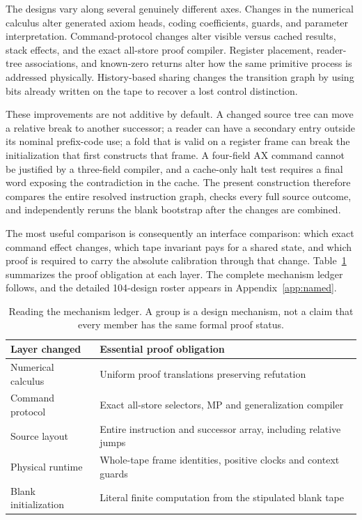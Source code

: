 \documentclass[11pt,a4paper]{article}
\begin{document}
The designs vary along several genuinely different axes. Changes in the
numerical calculus alter generated axiom heads, coding coefficients,
guards, and parameter interpretation. Command-protocol changes alter
visible versus cached results, stack effects, and the exact all-store
proof compiler. Register placement, reader-tree associations, and known-zero
returns alter how the same primitive process is addressed physically.
History-based sharing changes the transition graph by using bits already
written on the tape to recover a lost control distinction.

These improvements are not additive by default. A changed source tree can
move a relative break to another successor; a reader can have a secondary
entry outside its nominal prefix-code use; a fold that is valid on a
register frame can break the initialization that first constructs that
frame. A four-field AX command cannot be justified by a three-field
compiler, and a cache-only halt test requires a final word exposing the
contradiction in the cache. The present construction therefore compares
the entire resolved instruction graph, checks every full source outcome,
and independently reruns the blank bootstrap after the changes are combined.

The most useful comparison is consequently an interface comparison:
which exact command effect changes, which tape invariant pays for a shared
state, and which proof is required to carry the absolute calibration
through that change. Table~\ref{tab:families-note} summarizes the proof
obligation at each layer. The complete mechanism ledger follows, and the
detailed 104-design roster appears in Appendix~\ref{app:named}.
\begin{table}[h]
\centering
\caption{Reading the mechanism ledger. A group is a design mechanism, not
a claim that every member has the same formal proof status.}
\label{tab:families-note}
\begin{tabular}{p{.27\linewidth}p{.65\linewidth}}
\toprule
Layer changed & Essential proof obligation\\\midrule
Numerical calculus & Uniform proof translations preserving refutation\\
Command protocol & Exact all-store selectors, MP and generalization compiler\\
Source layout & Entire instruction and successor array, including relative jumps\\
Physical runtime & Whole-tape frame identities, positive clocks and context guards\\
Blank initialization & Literal finite computation from the stipulated blank tape\\
\bottomrule
\end{tabular}
\end{table}
\clearpage

\end{document}
